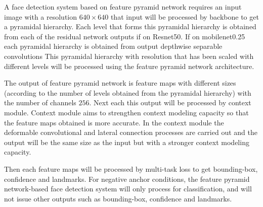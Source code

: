 A face detection system based on feature pyramid network requires an input image with a resolution
$640\times640$ that input will be processed by backbone to get a pyramidal hierarchy.
Each level that forms this pyramidal hierarchy is obtained from each of the residual network outputs
if on Resnet50. If on mobilenet0.25 each pyramidal hierarchy is obtained from output depthwise separable convolutions
This pyramidal hierarchy with resolution that has been scaled with different levels
will be processed using the feature pyramid network architecture.

The output of feature pyramid network is feature maps with different sizes
(according to the number of levels obtained from the pyramidal hierarchy) with the number of channels $256$. Next each
this output will be processed by context module. Context module aims to strengthen context modeling capacity
so that the feature maps obtained is more accurate. In the context module the deformable convolutional and lateral connection processes are carried out
and the output will be the same size as the input but with a stronger context modeling capacity.

Then each feature maps will be processed by multi-task loss to get bounding-box, confidence and landmarks.
For negative anchor conditions, the feature pyramid network-based face detection system will only process for classification, and will not issue
other outputs such as bounding-box, confidence and landmarks. \citep{deng2019retinaface}
